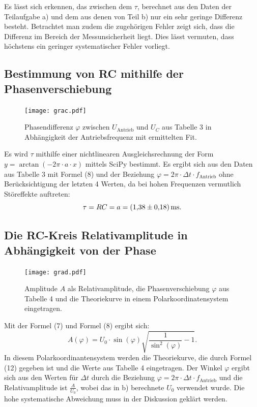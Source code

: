 Es lässt sich erkennen, das zwischen dem $\tau$, berechnet aus den Daten der
 Teilaufgabe a) und dem aus denen von Teil b) nur ein sehr geringe Differenz
  besteht. Betrachtet man zudem die zugehörigen Fehler zeigt sich, dass die
	Differenz im Bereich der Messunsicherheit liegt. Dies lässt vermuten, dass höchstens ein geringer systematischer Fehler vorliegt.

\subsection{Bestimmung von RC mithilfe der Phasenverschiebung}
	 \begin{figure}[H]
	 	\centering
	 	\caption{Phasendifferenz $\varphi$ zwischen $U_{\text{Antrieb}}$ und $U_C$ aus Tabelle 3 in Abhängigkeit der Antriebsfrequenz mit ermittelten Fit.}
	 	\texttt{[image: grac.pdf]}
	 	\label{fig:grac}
	 \end{figure}
	 
	 Es wird $\tau$ mithilfe einer nichtlinearen Ausgleichsrechnung der Form $y = \arctan(-2\pi \cdot a \cdot x)$ mittels SciPy \cite{scipy} bestimmt. Es ergibt sich aus den Daten aus Tabelle 3 mit Formel (8) und der Beziehung $\varphi=2\pi \cdot \Delta t \cdot f_{\text{Antrieb}}$ ohne Berücksichtigung der letzten 4 Werten, da bei hohen Frequenzen vermutlich Störeffekte auftreten:
	 \begin{displaymath}
	 \tau = RC = a = \SI{1.38 \pm 0.18}{\milli\second}\text{.}
	 \end{displaymath}


	 \subsection{Die RC-Kreis Relativamplitude in Abhängigkeit von der Phase}

	 \begin{figure}[H]
	  \centering
	  \caption{Amplitude $A$ als Relativamplitude, die Phasenverschiebung $\varphi$ aus Tabelle 4 und die Theoriekurve in einem Polarkoordinatensystem eingetragen.}
	  \texttt{[image: grad.pdf]}
	  \label{fig:grad}
	 \end{figure}
	 
	 Mit der Formel (7) und Formel (8) ergibt sich:
	 \begin{equation}
	 A(\varphi) = U_0\cdot \sin(\varphi)\sqrt{\frac{1}{\sin^2(\varphi)}-1}\text{.}
	 \end{equation}
	 In diesem Polarkoordinantensystem werden die Theoriekurve, die durch Formel (12) gegeben ist und die Werte aus Tabelle 4 eingetragen. Der Winkel $\varphi$ ergibt sich aus den Werten für $\Delta t$ durch die Beziehung $\varphi=2\pi \cdot \Delta t \cdot f_{\text{Antrieb}}$ und die Relativamplitude ist $\frac{A}{U_{0}}$, wobei das in b) berechnete $U_{0}$ verwendet wurde. Die hohe systematische Abweichung muss in der Diskussion geklärt werden.



